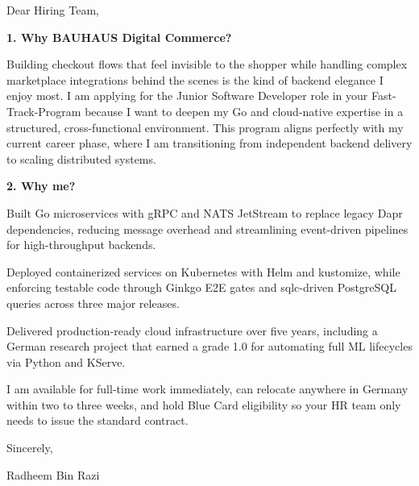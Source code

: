 \documentclass[11pt,a4paper]{coverletter}
\begin{document}

\opening{Dear Hiring Team,}

\vspace{8pt}\noindent\textbf{1. Why BAUHAUS Digital Commerce?}\par\vspace{3pt}

Building checkout flows that feel invisible to the shopper while handling complex marketplace integrations behind the scenes is the kind of backend elegance I enjoy most. I am applying for the Junior Software Developer role in your Fast-Track-Program because I want to deepen my Go and cloud-native expertise in a structured, cross-functional environment. This program aligns perfectly with my current career phase, where I am transitioning from independent backend delivery to scaling distributed systems.

\vspace{8pt}\noindent\textbf{2. Why me?}\par\vspace{3pt}

\bullets

  \item Built Go microservices with gRPC and NATS JetStream to replace legacy Dapr dependencies, reducing message overhead and streamlining event-driven pipelines for high-throughput backends.

  \item Deployed containerized services on Kubernetes with Helm and kustomize, while enforcing testable code through Ginkgo E2E gates and sqlc-driven PostgreSQL queries across three major releases.

  \item Delivered production-ready cloud infrastructure over five years, including a German research project that earned a grade 1.0 for automating full ML lifecycles via Python and KServe.

\bulletsend

I am available for full-time work immediately, can relocate anywhere in Germany within two to three weeks, and hold Blue Card eligibility so your HR team only needs to issue the standard contract.

\closing{Sincerely,}{Radheem Bin Razi}

\clearpage
{}

\end{document}
